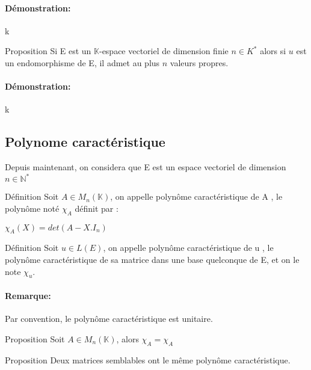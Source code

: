 \documentclass{book}
\begin{document}
\paragraph{Démonstration:}
k
\begin{Propriété}[]{Proposition}{}
Si E est un \(\mathbb{K}\)-espace vectoriel de dimension finie \(n \in K^*\) alors si \(u\) est un endomorphisme de E, il admet au plus \(n\) valeurs propres.
\end{Propriété}
\paragraph{Démonstration: }
k
\subsection{Polynome caractéristique}
Depuis maintenant, on considera que E est un espace vectoriel de dimension \(n \in \mathbb{N}^*\)
\begin{Définition}[]{Définition}{}
Soit \(A \in M_{n}(\mathbb{K})\), on appelle polynôme caractéristique de A , le polynôme noté \(\chi_{A}\) définit par :
\\ \begin{center}
\begin{framed}
    \(\chi_{A}(X)=det(A-X.I_{n})\)
\end{framed}
\end{center}
\end{Définition}
\begin{Définition}[]{Définition}{}
Soit \(u \in L(E)\), on appelle polynôme caractéristique de u , le polynôme caractéristique de sa matrice dans une base quelconque de E, et on le note \(\chi_{u}\).
\end{Définition}
\paragraph{Remarque: }
Par convention, le polynôme caractéristique est unitaire.
\begin{Propriété}[]{Proposition}{}
Soit \(A \in M_{n}(\mathbb{K})\), alors \(\chi_{A}=\chi_{A}\)
\end{Propriété}
\begin{Propriété}[]{Proposition}{}
Deux matrices semblables ont le même polynôme caractéristique.
\end{Propriété}
\end{document}
